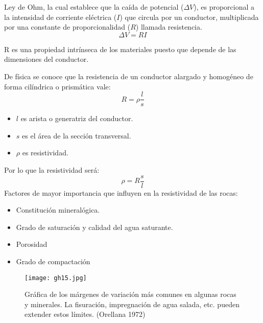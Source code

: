 Ley de Ohm, la cual establece que la caída de potencial ($\Delta V$),
es proporcional a la intensidad de corriente eléctrica ($I$)
que circula por un conductor, multiplicada por una constante de
proporcionalidad ($R$) llamada resistencia.
\begin{equation}
    \Delta V = RI
\end{equation}

R es una propiedad intrínseca de los materiales puesto que
depende de las dimensiones del conductor.

De física se conoce que la resistencia de un conductor alargado y
homogéneo de forma cilíndrica o prismática vale:
\begin{equation}
    R = \rho\frac{l}{s}
\end{equation}
\begin{notation}
    \begin{itemize}
        \item $l$ es arista o generatriz del conductor.
        \item $s$ es el área de la sección transversal.
        \item $\rho$ es resistividad.
    \end{itemize}
\end{notation}
Por lo que la resistividad será:
\begin{equation}
    \rho = R\frac{s}{l}
\end{equation}
Factores de mayor importancia que
influyen en la resistividad de las rocas:
\begin{itemize}
    \item Constitución mineralógica.
    \item Grado de saturación y calidad del agua saturante.
    \item Porosidad
    \item Grado de compactación
\end{itemize}
\begin{figure}[h!]
\centering
  \texttt{[image: gh15.jpg]}
  \caption{Gráfica de los márgenes de variación más comunes en algunas rocas y minerales. La fisuración, impregnación de agua salada, etc. pueden extender estos límites. (Orellana 1972)}
  \label{gh15}
\end{figure}
